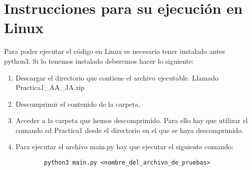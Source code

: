 \section{Instrucciones para su ejecución en Linux}
Para poder ejecutar el código en Linux es necesario tener instalado antes python3. Si lo tenemos instalado deberemos hacer lo siguiente:\\
\begin{enumerate}
	\item Descargar el directorio que contiene el archivo ejecutable. Llamado Practica1\_AA\_JA.zip
	\item Descomprimir el contenido de la carpeta.
	\item Acceder a la carpeta que hemos descomprimido. Para ello hay que utilizar el comando cd Practica1 desde el directorio en el que se haya descomprimido.
	\item Para ejecutar el archivo main.py hay que ejecutar el siguiente comando:
	\begin{lstlisting}
		python3 main.py <nombre_del_archivo_de_pruebas>
	\end{lstlisting}
\end{enumerate}

